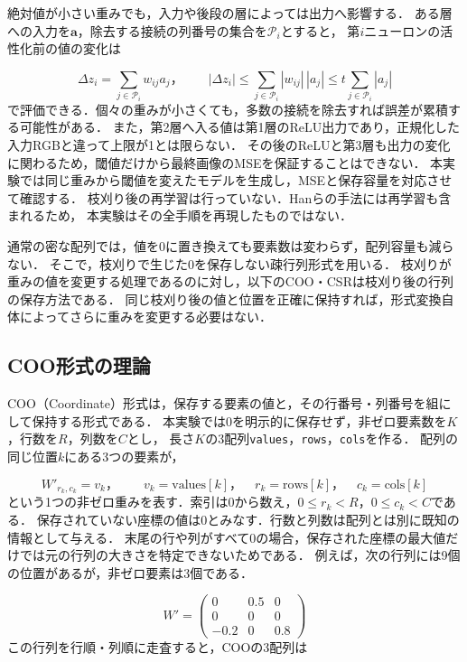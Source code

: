 \documentclass[a4paper,11pt]{article}
\newcommand{\code}[1]{\nolinkurl{#1}}
\begin{document}
絶対値が小さい重みでも，入力や後段の層によっては出力へ影響する．
ある層への入力を$\boldsymbol{a}$，除去する接続の列番号の集合を$\mathcal{P}_i$とすると，
第$i$ニューロンの活性化前の値の変化は

\[
    \Delta z_i=\sum_{j\in\mathcal{P}_i}w_{ij}a_j，\qquad
    |\Delta z_i|\leq\sum_{j\in\mathcal{P}_i}|w_{ij}|\,|a_j|
    \leq t\sum_{j\in\mathcal{P}_i}|a_j|
\]
%
で評価できる．個々の重みが小さくても，多数の接続を除去すれば誤差が累積する可能性がある．
また，第2層へ入る値は第1層のReLU出力であり，正規化した入力RGBと違って上限が1とは限らない．
その後のReLUと第3層も出力の変化に関わるため，閾値だけから最終画像のMSEを保証することはできない．
本実験では同じ重みから閾値を変えたモデルを生成し，MSEと保存容量を対応させて確認する．
枝刈り後の再学習は行っていない．Hanら\cite{han}の手法には再学習も含まれるため，
本実験はその全手順を再現したものではない．

通常の密な配列では，値を0に置き換えても要素数は変わらず，配列容量も減らない．
そこで，枝刈りで生じた0を保存しない疎行列形式を用いる．
枝刈りが重みの値を変更する処理であるのに対し，以下のCOO・CSRは枝刈り後の行列の保存方法である．
同じ枝刈り後の値と位置を正確に保持すれば，形式変換自体によってさらに重みを変更する必要はない．

\Needspace{65mm}
\subsection{COO形式の理論}\label{sec:coo-theory}

COO（Coordinate）形式は，保存する要素の値と，その行番号・列番号を組にして保持する形式である\cite{coo}．
本実験では0を明示的に保存せず，非ゼロ要素数を$K$，行数を$R$，列数を$C$とし，
長さ$K$の3配列\code{values}，\code{rows}，\code{cols}を作る．
配列の同じ位置$k$にある3つの要素が，

\[
    W'_{r_k,c_k}=v_k，\qquad
    v_k=\text{values}[k]，\quad
    r_k=\text{rows}[k]，\quad
    c_k=\text{cols}[k]
\]
%
という1つの非ゼロ重みを表す．索引は0から数え，$0\leq r_k<R$，$0\leq c_k<C$である．
保存されていない座標の値は0とみなす．行数と列数は配列とは別に既知の情報として与える．
末尾の行や列がすべて0の場合，保存された座標の最大値だけでは元の行列の大きさを特定できないためである．
例えば，次の行列には9個の位置があるが，非ゼロ要素は3個である．

\begin{equation}\label{eq:sparse-example}
    W'=\begin{pmatrix}
        0&0.5&0\\
        0&0&0\\
        -0.2&0&0.8
    \end{pmatrix}
\end{equation}
%
この行列を行順・列順に走査すると，COOの3配列は
\end{document}
